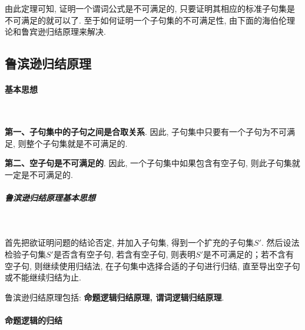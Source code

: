 由此定理可知, 证明一个谓词公式是不可满足的, 只要证明其相应的标准子句集是不可满足的就可以了. 至于如何证明一个子句集的不可满足性, 由下面的海伯伦理论和鲁宾逊归结原理来解决.

\subsection{鲁滨逊归结原理}
\paragraph{基本思想}~{}

\textbf{第一、子句集中的子句之间是合取关系}. 因此, 子句集中只要有一个子句为不可满足, 则整个子句集就是不可满足的.

\textbf{第二、空子句是不可满足的}. 因此, 一个子句集中如果包含有空子句, 则此子句集就一定是不可满足的.
\subparagraph{鲁滨逊归结原理基本思想}~{}

首先把欲证明问题的结论否定, 并加入子句集, 得到一个扩充的子句集$S'$. 然后设法检验子句集$S'$是否含有空子句, 若含有空子句, 则表明$S'$是不可满足的；若不含有空子句, 则继续使用归结法, 在子句集中选择合适的子句进行归结, 直至导出空子句或不能继续归结为止.

鲁滨逊归结原理包括: \textbf{命题逻辑归结原理, 谓词逻辑归结原理}.
\paragraph{命题逻辑的归结}~{}

